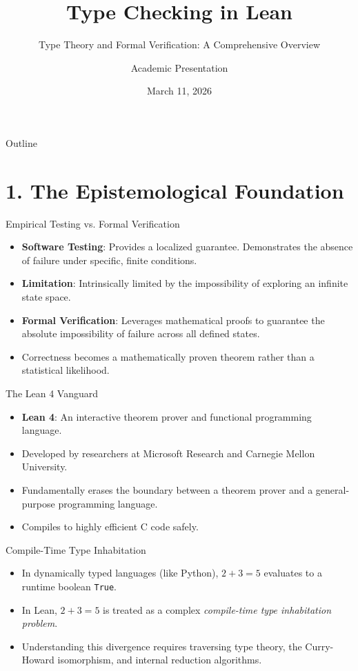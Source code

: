 \documentclass[12pt, aspectratio=169]{beamer}
\title{Type Checking in Lean}
\subtitle{Type Theory and Formal Verification: A Comprehensive Overview}
\author{Academic Presentation}
\institute{Study of Lean 4 Architecture}
\date{March 11, 2026}
\begin{document}
\begin{frame}
  \titlepage
\end{frame}

\begin{frame}{Outline}
  \tableofcontents[hideallsubsections]
\end{frame}

\section{1. The Epistemological Foundation}

\begin{frame}{Empirical Testing vs. Formal Verification}
\begin{itemize}\setlength{\itemsep}{1.2em}
  \item \textbf{Software Testing}: Provides a localized guarantee. Demonstrates the absence of failure under specific, finite conditions.
  \item \textbf{Limitation}: Intrinsically limited by the impossibility of exploring an infinite state space.
  \item \textbf{Formal Verification}: Leverages mathematical proofs to guarantee the absolute impossibility of failure across all defined states.
  \item Correctness becomes a mathematically proven theorem rather than a statistical likelihood.
\end{itemize}
\end{frame}

\begin{frame}{The Lean 4 Vanguard}
\begin{itemize}\setlength{\itemsep}{1.2em}
  \item \textbf{Lean 4}: An interactive theorem prover and functional programming language.
  \item Developed by researchers at Microsoft Research and Carnegie Mellon University.
  \item Fundamentally erases the boundary between a theorem prover and a general-purpose programming language.
  \item Compiles to highly efficient C code safely.
\end{itemize}
\end{frame}

\begin{frame}{Compile-Time Type Inhabitation}
\begin{itemize}\setlength{\itemsep}{1.2em}
  \item In dynamically typed languages (like Python), $2 + 3 = 5$ evaluates to a runtime boolean \texttt{True}.
  \item In Lean, $2 + 3 = 5$ is treated as a complex \textit{compile-time type inhabitation problem}.
  \item Understanding this divergence requires traversing type theory, the Curry-Howard isomorphism, and internal reduction algorithms.
\end{itemize}
\end{frame}
\end{document}
